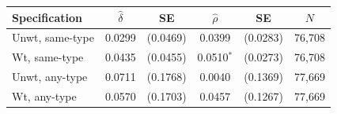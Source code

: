 \begin{tabular}{lccccc}
\toprule
Specification & $\hat{\delta}$ & SE & $\hat{\rho}$ & SE & $N$ \\
\midrule
Unwt, same-type & 0.0299 & (0.0469) & 0.0399 & (0.0283) & 76,708 \\
Wt, same-type & 0.0435 & (0.0455) & 0.0510$^{*}$ & (0.0273) & 76,708 \\
Unwt, any-type & 0.0711 & (0.1768) & 0.0040 & (0.1369) & 77,669 \\
Wt, any-type & 0.0570 & (0.1703) & 0.0457 & (0.1267) & 77,669 \\
\bottomrule
\end{tabular}
